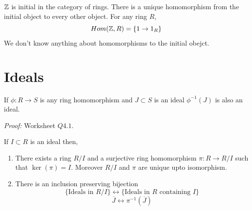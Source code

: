 \documentclass[12pt]{amsart}
\begin{document}
\begin{remark}
     $\mathbb Z$ is initial in the category of rings. There is a unique homomorphism from the initial object to every other object. For any ring $R$, 
    $$Hom(\mathbb Z, R) = \{1 \to 1_R\}$$
    We don't know anything about homomorphisms to the initial obejct. 
\end{remark}

\section{Ideals}


\begin{lemma}
     If $\phi: R\to S$ is any ring homomorphism and $J \subset S$ is an ideal $\phi^{-1} (J)$ is also an ideal. 

    \textit{Proof:} Worksheet $Q4.1$.  
\end{lemma}

\begin{theorem}
     If $I \subset R$ is an ideal then, 
    \begin{enumerate}
        \item There exists a ring $R/I$ and a surjective ring homomorphism $\pi: R \to R/I$ such that $\ker(\pi) = I$. Moreover $R/I$ and $\pi$ are unique upto isomorphism. 
        \item There is an inclusion preserving bijection 
        \[\{\text{Ideals in $R/I$}\} \leftrightarrow \{\text{Ideals in $R$ containing $I$}\}\]
        \[\overline{J} \leftrightarrow \pi^{-1}(\overline{J})\]
    \end{enumerate}
\end{theorem}
\end{document}
